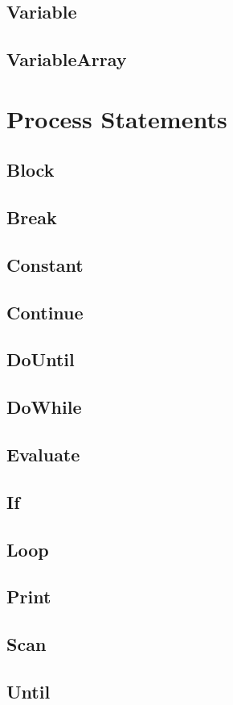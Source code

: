\subsection{Variable}
\subsection{VariableArray}
\section{Process Statements}
\subsection{Block}
\subsection{Break}
\subsection{Constant}
\subsection{Continue}
\subsection{DoUntil}
\subsection{DoWhile}
\subsection{Evaluate}
\subsection{If}
\subsection{Loop}
\subsection{Print}
\subsection{Scan}
\subsection{Until}
